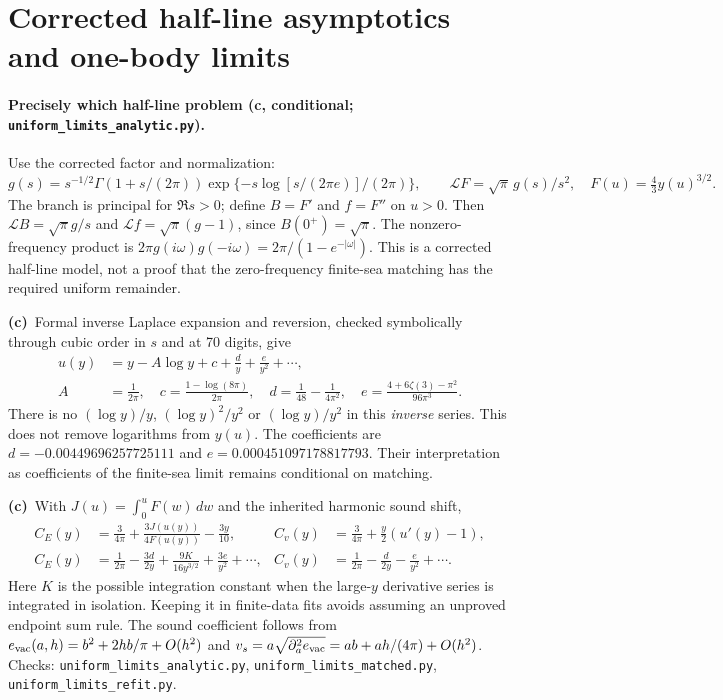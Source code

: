 \documentclass[11pt,a4paper]{article}
\newcommand{\C}{\textbf{(c)}\ }
\newcommand{\scr}[1]{\texttt{uniform\_\allowbreak limits\_\allowbreak #1.py}}
\begin{document}
\section{Corrected half-line asymptotics and one-body limits}
\paragraph{Precisely which half-line problem (c, conditional; \scr{analytic}).}
Use the corrected factor and normalization:
\begin{equation}
 g(s)=s^{-1/2}\Gamma(1+s/(2\pi))
 \exp\{-s\log[s/(2\pi e)]/(2\pi)\},\qquad
 \mathcal L F=\sqrt\pi\,g(s)/s^2,\quad F(u)=\tfrac43 y(u)^{3/2}.
 \label{eq:wh}
\end{equation}
The branch is principal for $\Re s>0$; define $B=F'$ and $f=F''$ on $u>0$.
Then $\mathcal L B=\sqrt\pi g/s$ and
$\mathcal L f=\sqrt\pi(g-1)$, since $B(0^+)=\sqrt\pi$.
The nonzero-frequency product is
$2\pi g(i\omega)g(-i\omega)=2\pi/(1-e^{-|\omega|})$.
This is a corrected half-line model, not a proof that the zero-frequency
finite-sea matching has the required uniform remainder.

\C Formal inverse Laplace expansion and reversion, checked symbolically
through cubic order in $s$ and at 70 digits, give
\begin{align}
 u(y)&=y-A\log y+c+\frac d y+\frac e{y^2}+\cdots,\label{eq:u}\\
 A&=\frac1{2\pi},\quad c=\frac{1-\log(8\pi)}{2\pi},\quad
 d=\frac1{48}-\frac1{4\pi^2},\quad
 e=\frac{4+6\zeta(3)-\pi^2}{96\pi^3}.\nonumber
\end{align}
There is no $(\log y)/y$, $(\log y)^2/y^2$ or $(\log y)/y^2$ in this
\emph{inverse} series. This does not remove logarithms from $y(u)$.
The coefficients are $d=-0.00449696257725111$ and
$e=0.000451097178817793$. Their interpretation as coefficients of the
finite-sea limit remains conditional on matching.

\C With $J(u)=\int_0^uF(w)\,dw$ and the inherited harmonic sound shift,
\begin{align}
 C_E(y)&=\frac3{4\pi}+\frac{3J(u(y))}{4F(u(y))}-\frac{3y}{10},
 &C_v(y)&=\frac3{4\pi}+\frac y2(u'(y)-1),\label{eq:CE}\\
 C_E(y)&=\frac1{2\pi}-\frac{3d}{2y}
       +\frac{9K}{16y^{3/2}}+\frac{3e}{y^2}+\cdots,
 &C_v(y)&=\frac1{2\pi}-\frac d{2y}-\frac e{y^2}+\cdots.\label{eq:tails}
\end{align}
Here $K$ is the possible integration constant when the large-$y$ derivative
series is integrated in isolation. Keeping it in finite-data fits avoids
assuming an unproved endpoint sum rule. The sound coefficient follows from
$e_{\rm vac}(a,h)=b^2+2hb/\pi+O(h^2)$ and
$v_s=a\sqrt{\partial_a^2e_{\rm vac}}=ab+ah/(4\pi)+O(h^2)$.
Checks: \scr{analytic}, \scr{matched}, \scr{refit}.
\end{document}
